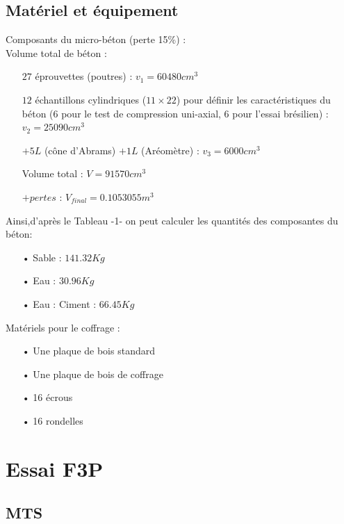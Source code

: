 \documentclass[12pt]{report}
\begin{document}
\section{Matériel et équipement}
Composants du micro-béton (perte 15\%) :\\
Volume total de béton :\\
\begin{itemize} 
\item[\triangleright] $27$ éprouvettes (poutres) : $v_1 = 60480 cm^3$
\item[\triangleright] $12$ échantillons cylindriques ($11\times 22$) pour définir les caractéristiques du béton (6 pour le
   test de compression uni-axial, 6 pour l’essai brésilien) : $v_2 = 25090 cm^3$
\item[\triangleright] $+5L$ (cône d’Abrams) $+1L$ (Aréomètre) : $v_3 = 6000 cm^3$
\item[\triangleright] Volume total : $V = 91570 cm^3$
\item[\triangleright] $+pertes$ : $V_{final} = 0.1053055 m^3$\\
\end{itemize}
Ainsi,d’après le Tableau -1- on peut calculer les quantités des composantes du béton:\\
\begin{itemize}
\item[•] Sable : $141.32 Kg$
\item[•] Eau : $30.96 Kg$
\item[•] Eau : Ciment : $66.45 Kg$\\
\end{itemize}
Matériels pour le coffrage :\\
\begin{itemize}
\item[•] Une plaque de bois standard
\item[•] Une plaque de bois de coffrage
\item[•] 16 écrous
\item[•] 16 rondelles
\end{itemize}





\chapter{Essai F3P}
\section{MTS}
\end{document}
